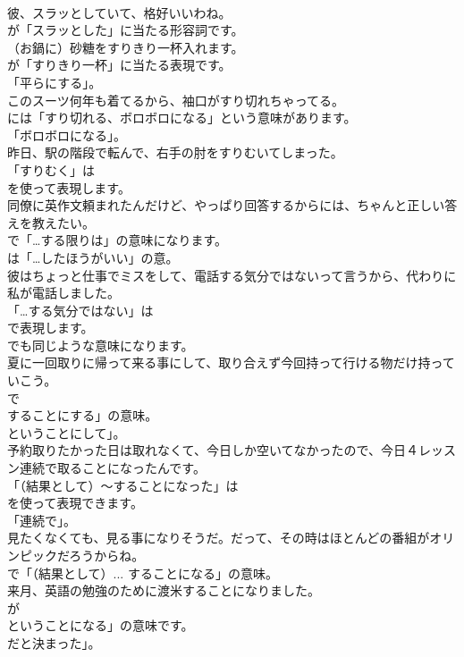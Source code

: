 \documentclass[8pt]{extreport}
\begin{document}
\begin{CJK}{UTF8}{min}
\\	彼、スラッとしていて、格好いいわね。 
\\	が「スラッとした」に当たる形容詞です。	
\\	（お鍋に）砂糖をすりきり一杯入れます。 
\\	が「すりきり一杯」に当たる表現です。
\\	「平らにする」。	
\\	このスーツ何年も着てるから、袖口がすり切れちゃってる。 
\\	には「すり切れる、ボロボロになる」という意味があります。
\\	「ボロボロになる」。	
\\	昨日、駅の階段で転んで、右手の肘をすりむいてしまった。 
\\	「すりむく」は
\\	を使って表現します。	
\\	同僚に英作文頼まれたんだけど、やっぱり回答するからには、ちゃんと正しい答えを教えたい。 
\\	で「…する限りは」の意味になります。
\\	は「…したほうがいい」の意。	
\\	彼はちょっと仕事でミスをして、電話する気分ではないって言うから、代わりに私が電話しました。 
\\	「…する気分ではない」は 
\\	で表現します。
\\	でも同じような意味になります。	
\\	夏に一回取りに帰って来る事にして、取り合えず今回持って行ける物だけ持っていこう。 
\\	で
\\	することにする」の意味。
\\	ということにして」。	
\\	予約取りたかった日は取れなくて、今日しか空いてなかったので、今日４レッスン連続で取ることになったんです。 
\\	「（結果として）～することになった」は
\\	を使って表現できます。
\\	「連続で」。	
\\	見たくなくても、見る事になりそうだ。だって、その時はほとんどの番組がオリンピックだろうからね。 
\\	で「（結果として）... することになる」の意味。	
\\	来月、英語の勉強のために渡米することになりました。 
\\	が
\\	ということになる」の意味です。
\\	だと決まった」。	

\end{CJK}
\end{document}
